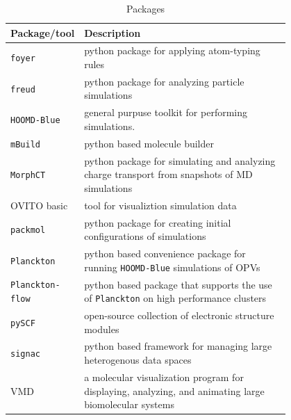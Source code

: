  

\begin{table}[]
    \caption{Packages} %
\centering %
\begin{tabular}{|l|p{0.8\linewidth}|} %
\hline\hline %
Package/tool & Description \\ [0.5ex] %
\hline %
    \texttt{foyer} & python package for applying atom-typing rules  \cite{Klein2018a}\\ [1ex] %
\texttt{freud} & python package for analyzing particle simulations  \cite{Ramasubramani2020}\\ [1ex] %
\texttt{HOOMD-Blue} & general purpuse toolkit for performing simulations.   \cite{Anderson2020a}\\ [1ex] %
    \texttt{mBuild} & python based molecule builder \cite{Klein2018a}\\ [1ex] %
\texttt{MorphCT} & python package for simulating and analyzing charge transport from 
    snapshots of MD simulations \cite{jones2017}\cite{cmelab}\\[1ex] 
OVITO basic & tool for visualiztion simulation data \cite{Stukowski2010a}\\[1ex] 
\texttt{packmol} & python package for creating initial configurations of simulations \cite{Martinez2009}\\[1ex] 
\texttt{Planckton} & python based convenience package for running \texttt{HOOMD-Blue}
    simulations of OPVs \cite{cmelab}\\[1ex]
    \texttt{Planckton-flow} & python based package that supports the use of \texttt{Planckton} on
    high performance clusters\cite{cmelab}\\[1ex]
\texttt{pySCF} & open-source collection of electronic structure modules \cite{Sun2018a}\\[1ex]
\texttt{signac} & python based framework for managing large heterogenous data spaces \cite{Adorf2016}\\[1ex]
VMD & a molecular visualization program for displaying, analyzing, and animating large biomolecular
    systems \cite{Humphrey1996}\\


\hline %
\end{tabular}
\label{packages} %
\end{table}

